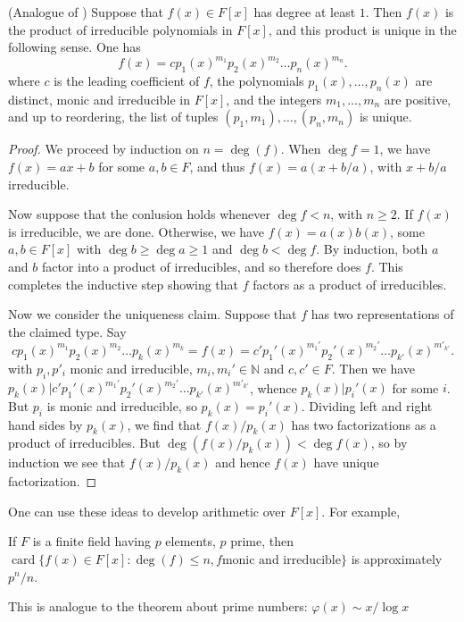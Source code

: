\begin{theorem}(Analogue of )
	Suppose that $f(x) \in F[x]$ has degree at least $1$. Then $f(x)$ is the product of irreducible polynomials in $F[x]$, and this product is unique in the following sense. One has
	\[
		f(x) = c p_1(x)^{m_1} p_2(x)^{m_2}\ldots p_n(x)^{m_n}
	.\] 
	where $c$ is the leading coefficient of $f$, the polynomials $p_1(x), \ldots, p_n(x)$ are distinct, monic and irreducible in $F[x]$, and the integers $m_1, \ldots, m_n$ are positive, and up to reordering, the list of tuples $(p_1, m_1), \ldots, (p_n, m_n)$ is unique.
\end{theorem}
\begin{proof}
	We proceed by induction on $n = \operatorname{deg} (f)$. When $\operatorname{deg} f = 1$, we have $f(x) = a x + b$ for some $a, b \in F$, and thus $f(x) = a(x+b / a)$, with $x + b / a$ irreducible.

	Now suppose that the conlusion holds whenever $\operatorname{deg}  f < n$, with $n \ge 2$. If $f(x)$ is irreducible, we are done. Otherwise, we have $f(x) = a(x) b(x)$, some $a, b \in F[x]$ with $\operatorname{deg} b \ge \operatorname{deg} a \ge 1$ and $\operatorname{deg} b < \operatorname{deg} f$. By induction, both $a$ and $b$ factor into a product of irreducibles, and so therefore does $f$. This completes the inductive step showing that $f$ factors as a product of irreducibles.

	Now we consider the uniqueness claim. Suppose that $f$ has two representations of the claimed type. Say
	\[
		c p_1(x)^{m_1} p_2(x)^{m_2}\ldots p_k(x)^{m_k} = f(x) = c' p_1'(x)^{m_1'} p_2'(x)^{m_2'}\ldots p_{k'}(x)^{m'_{k'}}
	.\] 
	with $p_i, p'_i$ monic and irreducible, $m_i, m_i' \in \mathbb{N}$ and $c, c' \in F$. Then we have $p_k(x) | c'p_1'(x)^{m_1'} p_2'(x)^{m_2'}\ldots p_{k'}(x)^{m'_{k'}}$, whence $p_k(x) | p_i'(x)$ for some $i$. But $p_i$ is monic and irreducible, so $p_k(x) = p_i'(x)$. Dividing left and right hand sides by $p_k(x)$, we find that $f(x) / p_k(x)$ has two factorizations as a product of irreducibles. But $\operatorname{deg} (f(x) / p_k(x)) < \operatorname{deg} f(x)$, so by induction we see that $f(x) / p_k(x)$ and hence $f(x)$ have unique factorization.
\end{proof}

One can use these ideas to develop arithmetic over $F[x]$. For example,
\begin{fact}
	If $F$ is a finite field having $p$ elements, $p$ prime, then \\
	$\operatorname{card} \{f(x) \in F[x]: \operatorname{deg} (f) \le n, f \text{monic and irreducible}\}  $ is approximately $p^n / n$.

	This is analogue to the theorem about prime numbers: $\varphi(x) \sim x / \log x$
\end{fact}

